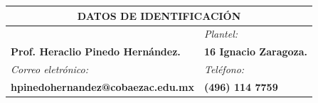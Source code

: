 
    \addtolength{\headheight}{25pt}
    \begin{center}
        \begin{tabularx}{1\textwidth}{| X | X |}
            \hline
            \multicolumn{2}{|c|}{{\cellcolor{green}}DATOS DE IDENTIFICACIÓN} \\
            \hline
            \rowcolor[rgb]{0.753,0.753,0.753}\centering {\it Nombre del docente:} &  {\it Plantel:}  \\
            \hline
            {\bf Prof. Heraclio Pinedo Hernández.} & {\bf 16 Ignacio Zaragoza.} \\
            \hline
            \rowcolor[rgb]{0.753,0.753,0.753}
            {\it Correo eletrónico:} & {\it Teléfono:} \\
            \hline
            {\bf hpinedohernandez@cobaezac.edu.mx} & {\bf (496) 114 7759} \\
            \hline
        \end{tabularx}
    \end{center}
